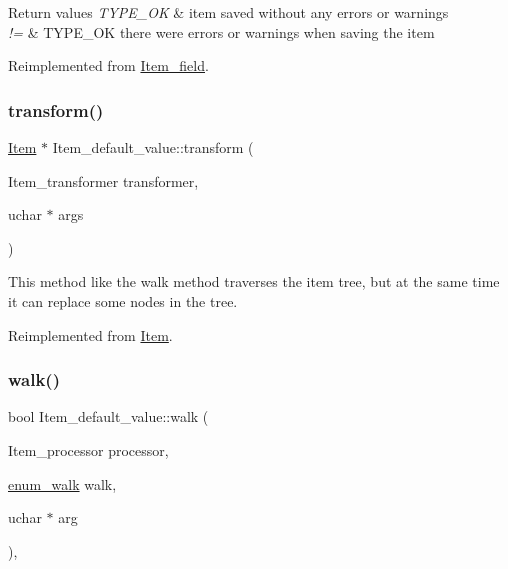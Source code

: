 \begin{DoxyRetVals}{Return values}
{\em T\+Y\+P\+E\+\_\+\+OK} & item saved without any errors or warnings \\
\hline
{\em !=} & T\+Y\+P\+E\+\_\+\+OK there were errors or warnings when saving the item \\
\hline
\end{DoxyRetVals}


Reimplemented from \mbox{\hyperlink{classItem__field_a6a89af67b3665a4d25c24300fa8e298e}{Item\+\_\+field}}.

\mbox{\label{classItem__default__value_af8efb13ec5ade9320533c1e508d995ee}} 
\subsubsection{\texorpdfstring{transform()}{transform()}}
{\footnotesize\ttfamily \mbox{\hyperlink{classItem}{Item}} $\ast$ Item\+\_\+default\+\_\+value\+::transform (\begin{DoxyParamCaption}\item[{Item\+\_\+transformer}]{transformer,  }\item[{uchar $\ast$}]{args }\end{DoxyParamCaption})\hspace{0.3cm}{\ttfamily [virtual]}}

This method like the walk method traverses the item tree, but at the same time it can replace some nodes in the tree. 

Reimplemented from \mbox{\hyperlink{classItem_ae4459c9d19c2c656c63da3bbd32760e5}{Item}}.

\mbox{\label{classItem__default__value_aa26d7118262053541ab095b9f9c7d53f}} 
\subsubsection{\texorpdfstring{walk()}{walk()}}
{\footnotesize\ttfamily bool Item\+\_\+default\+\_\+value\+::walk (\begin{DoxyParamCaption}\item[{Item\+\_\+processor}]{processor,  }\item[{\mbox{\hyperlink{classItem_a4e68f315ba2a26543339e9f0efed3695}{enum\+\_\+walk}}}]{walk,  }\item[{uchar $\ast$}]{arg }\end{DoxyParamCaption})\hspace{0.3cm}{\ttfamily [inline]}, {\ttfamily [virtual]}}

